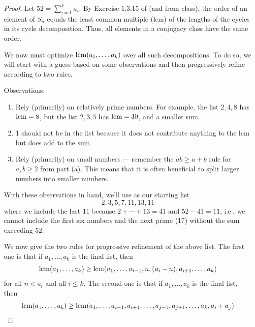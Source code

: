 \documentclass[../psets.tex]{subfiles}
\begin{document}
\begin{enumerate}
\begin{enumerate}
\begin{proof}
            Let $52=\sum_{i=1}^ka_i$. By Exercise 1.3.15 of \textcite{bib:DummitFoote} (and from class), the order of an element of $S_n$ equals the least common multiple (lcm) of the lengths of the cycles in its cycle decomposition. Thus, all elements in a conjugacy class have the same order.\par
            We now must optimize $\operatorname{lcm}(a_1,\dots,a_k)$ over all such decompositions. To do so, we will start with a guess based on some observations and then progressively refine according to two rules.\par
            Observations:
            \begin{enumerate}[label={(\arabic*)}]
                \item Rely (primarily) on relatively prime numbers. For example, the list $2,4,8$ has $\operatorname{lcm}=8$, but the list $2,3,5$ has $\operatorname{lcm}=30$, and a smaller sum.
                \item 1 should not be in the list because it does not contribute anything to the lcm but does add to the sum.
                \item Rely (primarily) on small numbers --- remember the $ab\geq a+b$ rule for $a,b\geq 2$ from part (a). This means that it is often beneficial to split larger numbers into smaller numbers.
            \end{enumerate}
            With these observations in hand, we'll use as our starting list
            \begin{equation*}
                2,3,5,7,11,13,11
            \end{equation*}
            where we include the last 11 because $2+\cdots+13=41$ and $52-41=11$, i.e., we cannot include the first six numbers and the next prime (17) without the sum exceeding 52.\par\smallskip
            We now give the two rules for progressive refinement of the above list. The first one is that if $a_1,\dots,a_k$ is the final list, then
            \begin{equation*}
                \operatorname{lcm}(a_1,\dots,a_k) \geq \operatorname{lcm}(a_1,\dots,a_{i-1},n,(a_i-n),a_{i+1},\dots,a_k)
            \end{equation*}
            for all $n<a_i$ and all $i\leq k$. The second one is that if $a_1,\dots,a_k$ is the final list, then
            \begin{equation*}
                \operatorname{lcm}(a_1,\dots,a_k) \geq \operatorname{lcm}(a_1,\dots,a_{i-1},a_{i+1},\dots,a_{j-1},a_{j+1},\dots,a_k,a_i+a_j)
            \end{equation*}

\end{proof}
\end{enumerate}
\end{enumerate}
\end{document}
